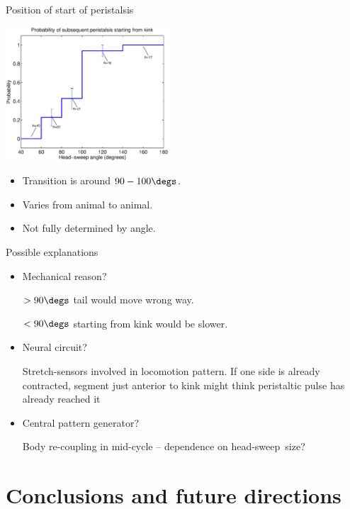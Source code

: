 \documentclass{beamer}%
\newcommand{\hs}{head-sweep}
\begin{document}
\begin{frame}{Position of start of peristalsis}
%
 \begin{center}
   \includegraphics[height=5cm]{Figs/ProbKink.eps}
 \end{center}

 \begin{itemize}
 \item Transition is around $90-100\degs$.
 \item Varies from animal to animal.
 \item Not fully determined by angle.
 \end{itemize}
%
\end{frame}


\begin{frame}{Possible explanations}
%
 \begin{itemize}
   \item Mechanical reason?

   $>90\degs$ tail would move wrong way.

   $<90\degs$ starting from kink would be slower.
   \vp

   \item Neural circuit?

   Stretch-sensors involved in locomotion pattern. If one side is already contracted, segment just anterior to kink might think peristaltic pulse has already reached it
   \vp

   \item Central pattern generator?

   Body re-coupling in mid-cycle -- dependence on \hs\ size?
 \end{itemize}
%
\end{frame}


\section{Conclusions and future directions}
\end{document}
